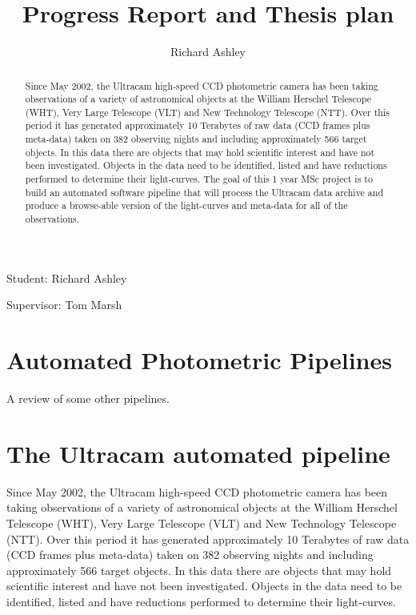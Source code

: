 \documentclass[a4paper,10pt]{article}
\begin{document}
\title{Progress Report and Thesis plan}
\author{Richard Ashley}
\maketitle
\begin{flushright}
Student: Richard Ashley

Supervisor: Tom Marsh
\end{flushright}

\begin{abstract} 
Since May 2002, the  Ultracam high-speed CCD 
photometric camera has been taking observations of a variety of 
astronomical objects at the William Herschel Telescope (WHT), Very 
Large Telescope (VLT) and New Technology Telescope (NTT). Over this 
period it has generated approximately 10 Terabytes of raw data (CCD 
frames plus meta-data) taken on 382 observing nights and including 
approximately 566 target objects. In this data there are objects 
that may hold scientific interest and have not been investigated. 
Objects in the data need to be identified, listed and have 
reductions performed to determine their light-curves. The goal of 
this 1 year MSc project is to build an automated software pipeline 
that will process the Ultracam data archive and produce a browse-able 
version of the light-curves and meta-data for all of the 
observations. 
\end{abstract}

\section{Automated Photometric Pipelines}

A review of some other pipelines. 

\section{The Ultracam automated pipeline} 

Since May 2002, the  Ultracam high-speed CCD photometric camera has been taking 
observations of a variety of astronomical objects at the William 
Herschel Telescope (WHT), Very Large Telescope (VLT) and New 
Technology Telescope (NTT). Over this period it has generated 
approximately 10 Terabytes of raw data (CCD frames plus meta-data) 
taken on 382 observing nights and including approximately 566 target 
objects. In this data there are objects that may hold scientific 
interest and have not been investigated. Objects in the data need to 
be identified, listed and have reductions performed to determine 
their light-curves.
\end{document}
